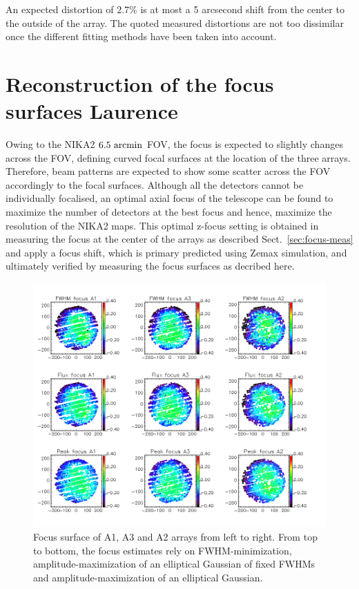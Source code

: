 An expected distortion of $2.7\%$ is at most a 5 arcsecond shift from the
center to the outside of the array.  The quoted measured distortions are not
too dissimilar once the different fitting methods have been taken into
account.



\section{Reconstruction of the focus surfaces {\color{blue} Laurence} }
\label{sec:focus_surfaces}

Owing to the NIKA2 $6.5~\rm{arcmin}$ FOV, the focus is expected to
slightly changes across the FOV, defining curved focal surfaces at the
location of the three arrays. Therefore, beam patterns are expected to
show some scatter across the FOV accordingly to the focal
surfaces. Although all the detectors cannot be individually focalised,
an optimal axial focus of the telescope can be found to maximize the
number of detectors at the best focus and hence, maximize the
resolution of the NIKA2 maps.
This optimal z-focus setting is obtained
in measuring the focus at the center of the arrays as described
Sect.~\ref{sec:focus-meas} and apply a focus shift, which is primary
predicted using Zemax simulation, and ultimately verified by measuring
the focus surfaces as decribed here.

\begin{figure}
\begin{center}
  \includegraphics[trim={0, 1cm, 0, 1cm}, clip, angle=0, scale=0.5]{Figures/fov_focus_mv_5.png}
\caption[Focus surfaces]{Focus surface of A1, A3 and A2 arrays from left to
  right. From top to bottom, the focus estimates rely on
  FWHM-minimization, amplitude-maximization of an elliptical
  Gaussian of fixed FWHMs and amplitude-maximization of an elliptical
  Gaussian.}
\label{fig:focus-surfaces}
\end{center}
\end{figure}

